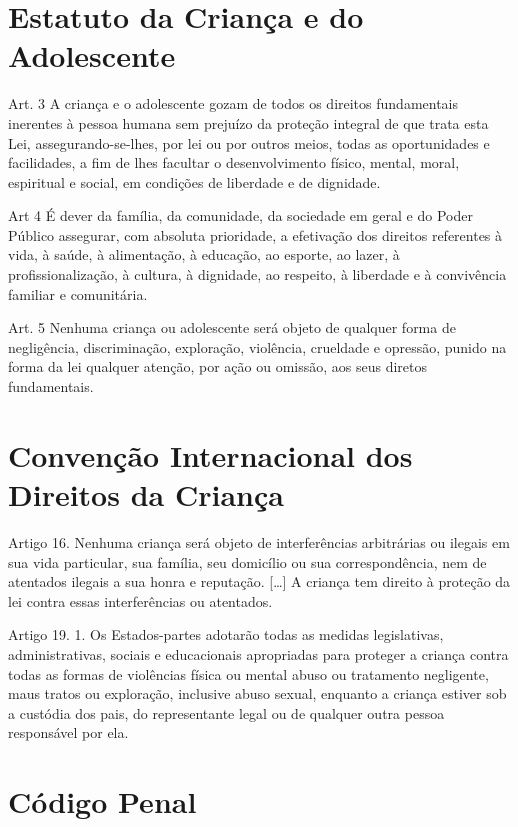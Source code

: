 \chapter{Estatuto da Criança e do Adolescente}

Art. 3{\textordmasculine} A criança e o adolescente gozam de todos os direitos fundamentais inerentes à pessoa humana sem prejuízo da proteção integral de que trata esta Lei, assegurando-se-lhes, por lei ou por outros meios, todas as oportunidades e facilidades, a fim de lhes facultar o desenvolvimento físico, mental, moral, espiritual e social, em condições de liberdade e de dignidade.

Art 4{\textordmasculine} É dever da família, da comunidade, da sociedade em geral e do Poder Público assegurar, com absoluta prioridade, a efetivação dos direitos referentes à vida, à saúde, à alimentação, à educação, ao esporte, ao lazer, à profissionalização, à cultura, à dignidade, ao respeito, à liberdade e à convivência familiar e comunitária. 

Art. 5{\textordmasculine} Nenhuma criança ou adolescente será objeto de qualquer forma de negligência, discriminação, exploração, violência, crueldade e opressão, punido na forma da lei qualquer atenção, por ação ou omissão, aos seus diretos fundamentais.

\chapter{Convenção Internacional dos Direitos da Criança}

Artigo 16. Nenhuma criança será objeto de interferências arbitrárias ou ilegais em sua vida particular, sua família, seu domicílio ou sua correspondência, nem de atentados ilegais a sua honra e reputação. [\ldots] A criança tem direito à proteção da lei contra essas interferências ou atentados.

Artigo 19. 1. Os Estados-partes adotarão todas as medidas legislativas, administrativas, sociais e educacionais apropriadas para proteger a criança contra todas as formas de violências física ou mental abuso ou tratamento negligente, maus tratos ou exploração, inclusive abuso sexual, enquanto a criança estiver sob a custódia dos pais, do representante legal ou de qualquer outra pessoa responsável por ela.

\chapter{Código Penal}

